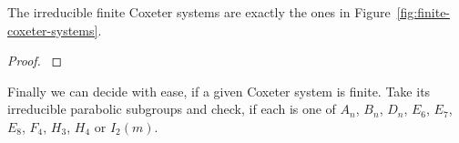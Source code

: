\begin{theo}
	The irreducible finite Coxeter systems are exactly the ones in Figure~\ref{fig:finite-coxeter-systems}.

	\begin{proof}
		\cite[Theorem 6.4]{humphreys:coxeter}
	\end{proof}
\end{theo}

Finally we can decide with ease, if a given Coxeter system is finite. Take its irreducible parabolic subgroups and check, if each is one of $A_n$, $B_n$, $D_n$, $E_6$, $E_7$, $E_8$, $F_4$, $H_3$, $H_4$ or $I_2(m)$.

